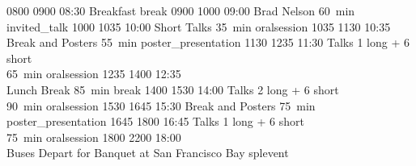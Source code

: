 \begin{timetable}
   {0800} {0900} {08:30 Breakfast}                      {}                            {}        {break}
   {0900} {1000} {09:00 Brad Nelson}                 {60~min}                        {}                      {invited_talk}
   {1000} {1035} {10:00 Short Talks}                  {\vspace{1.5mm}35~min}          {}        {oralsession}
   {1035} {1130} {10:35 Break and Posters}            {\vspace{1.5mm}55~min}          {}      {poster_presentation}
   {1130} {1235} {11:30 Talks}                        {\vspace{-0.5em}1 long + 6 short\\65~min}{}             {oralsession}
   {1235} {1400} {12:35\\[0.2em]Lunch Break}          {85~min}                        {}                            {break}
   {1400} {1530} {14:00 Talks}                        {\vspace{-0.5em}2 long + 6 short\\90~min}{}             {oralsession}
   {1530} {1645} {15:30 Break and Posters}            {\vspace{1.5mm}75~min}          {}      {poster_presentation}
   {1645} {1800} {16:45 Talks}                        {\vspace{-0.5em}1 long + 6 short\\75~min}{}             {oralsession}
   {1800} {2200} {18:00\\\vspace{0.3em}Buses Depart for Banquet}       {}          {\vspace{-0.7em}at San Francisco Bay}     {splevent}




\end{timetable}
